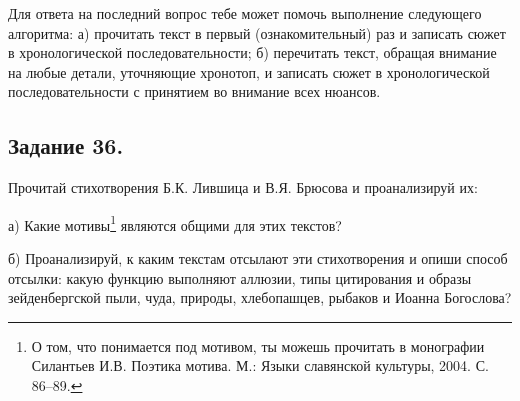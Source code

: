     Для ответа на последний вопрос тебе может помочь выполнение следующего алгоритма: а) прочитать текст в первый (ознакомительный) раз и записать сюжет в хронологической последовательности; б) перечитать текст, обращая внимание на любые детали, уточняющие хронотоп, и записать сюжет в хронологической последовательности с принятием во внимание всех нюансов.

\subsection*{Задание 36.}
    Прочитай стихотворения Б.К. Лившица и В.Я. Брюсова и проанализируй их:
    \begin{compactenum}
        \setlength\itemsep{-0.25em}
        \item[а)] Какие мотивы\footnote{О том, что понимается под мотивом, ты можешь прочитать в монографии Силантьев И.В. Поэтика мотива. М.: Языки славянской культуры, 2004. С. 86–89.} являются общими для этих текстов?
        \item[б)] Проанализируй, к каким текстам отсылают эти стихотворения и опиши способ отсылки: какую функцию выполняют аллюзии, типы цитирования и образы зейденбергской пыли, чуда, природы, хлебопашцев, рыбаков и Иоанна Богослова?
    \end{compactenum}
    
